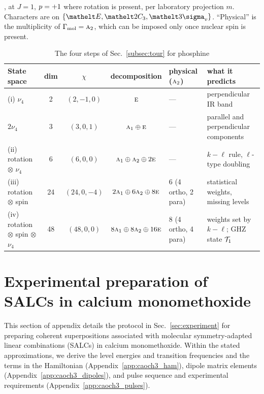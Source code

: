 \begin{table}[t]
\caption{The four steps of Sec.~\ref{subsec:tour} for phosphine}, at $J=1$, $p=+1$ where rotation is present, per laboratory projection $m$. Characters are on $\{\cls{E},\cls{2C_{3}},\cls{3\sigma_{v}}\}$. ``Physical'' is the multiplicity of $\Gamma_{\mathrm{mol}}=\text{\normalfont\scshape a}_{2}$, which can be imposed only once nuclear spin is present.
\label{tab:tour}
\centering
\small
\begin{tabular}{lcccll}
\toprule
State space & dim & $\chi$ & decomposition & physical ($\text{\normalfont\scshape a}_{2}$) & what it predicts\\
\midrule
(i) $\nu_4$ & 2 & $(2,-1,0)$ & $\text{\normalfont\scshape e}$ & --- & perpendicular IR band\\
\phantom{(i)} $2\nu_4$ & 3 & $(3,0,1)$ & $\text{\normalfont\scshape a}_{1}\oplus \text{\normalfont\scshape e}$ & --- & parallel and perpendicular components\\
(ii) rotation $\otimes$ $\nu_4$ & 6 & $(6,0,0)$ & $\text{\normalfont\scshape a}_{1}\oplus \text{\normalfont\scshape a}_{2}\oplus2\text{\normalfont\scshape e}$ & --- & $k-\ell$ rule, $\ell$-type doubling\\
(iii) rotation $\otimes$ spin & 24 & $(24,0,-4)$ & $2\text{\normalfont\scshape a}_{1}\oplus6\text{\normalfont\scshape a}_{2}\oplus8\text{\normalfont\scshape e}$ & 6 (4 ortho, 2 para) & statistical weights, missing levels\\
(iv) rotation $\otimes$ spin $\otimes$ $\nu_4$ & 48 & $(48,0,0)$ & $8\text{\normalfont\scshape a}_{1}\oplus8\text{\normalfont\scshape a}_{2}\oplus16\text{\normalfont\scshape e}$ & 8 (4 ortho, 4 para) & weights set by $k-\ell$; GHZ state $\mathcal{T}_{1}$\\
\bottomrule
\end{tabular}
\end{table}






\section{Experimental preparation of SALCs in calcium monomethoxide}
\label{app:caoch3_prep}

This section of appendix details the protocol in Sec.~\ref{sec:experiment} for preparing coherent superpositions associated with molecular symmetry-adapted linear combinations (SALCs) in calcium monomethoxide. Within the stated approximations, we derive the level energies and transition frequencies and the terms in the Hamiltonian (Appendix~\ref{app:caoch3_ham}), dipole matrix elements (Appendix~\ref{app:caoch3_dipoles}), and pulse sequence and experimental requirements (Appendix~\ref{app:caoch3_pulses}).

